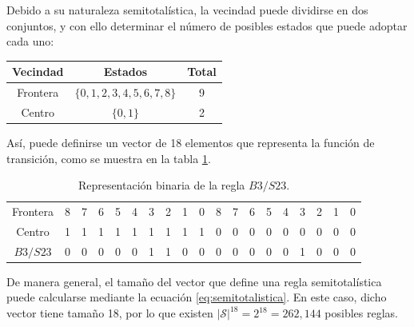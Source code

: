 Debido a su naturaleza semitotalística, la vecindad puede dividirse en dos conjuntos, y con ello determinar el número de posibles estados que puede adoptar cada uno:

\begin{table}[H] 
	
	\centering 
	
	\begin{tabular}{c|c|c}
		
		\hline \textbf{Vecindad} & \textbf{Estados} & \textbf{Total} \\ \hline 
		
		Frontera & $\{ 0,1,2,3,4,5,6,7,8 \}$ & 9 \\ 
		
		Centro & $\{ 0, 1 \}$ & 2 
		
		\\ 
		
	\end{tabular} 
	
\end{table}

Así, puede definirse un vector de 18 elementos que representa la función de transición, como se muestra en la tabla \ref{tab:life}.

\begin{table}[H] 
	
	\centering 
	
	\begin{tabular}{c|c|c|c|c|c|c|c|c|c|c|c|c|c|c|c|c|c|c} 
		
		\hline 
		
		Frontera & 8& 7 & 6 & 5 & 4 & 3 & 2 & 1 & 0 & 8 &7 & 6 & 5 & 4 & 3 & 2 &1 &0 \\ 
		
		Centro & 1& 1& 1& 1& 1& 1& 1& 1& 1& 0& 0&0&0&0&0&0&0&0 \\ \hline 
		
		$B3/S23$ & 0 & 0 & 0 & 0 & 0 & 1 & 1 & 0 & 0 & 0 & 0 & 0 & 0 & 0 & 1 & 0 & 0 & 0 
		
		\\ \hline 
		
	\end{tabular}
	
	\caption{Representación binaria de la regla $B3/S23$.} 
	
	\label{tab:life} 
	
\end{table}

De manera general, el tamaño del vector que define una regla semitotalística puede calcularse mediante la ecuación \ref{eq:semitotalistica}. En este caso, dicho vector tiene tamaño 18, por lo que existen $|\mathcal{S}|^{18} = 2^{18} = 262,144$ posibles reglas.

